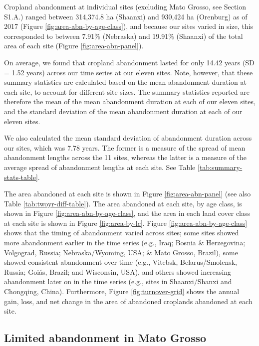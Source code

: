 \documentclass[9pt,twocolumn,twoside,lineno]{pnas-new}
\begin{document}
Cropland abandonment at individual sites (excluding Mato Grosso, see Section S1.A.) ranged between 314,374.8 ha (Shaanxi) and 930,424 ha (Orenburg) as of 2017 (Figure \ref{fig:area-abn-by-age-class}), and because our sites varied in size, this corresponded to between 7.91\% (Nebraska) and 19.91\% (Shaanxi) of the total area of each site (Figure \ref{fig:area-abn-panel}).

On average, we found that cropland abandonment lasted for only 14.42 years (SD = 1.52 years) across our time series at our eleven sites.
Note, however, that these summary statistics are calculated based on the mean abandonment duration at each site, to account for different site sizes.
The summary statistics reported are therefore the mean of the mean abandonment duration at each of our eleven sites, and the standard deviation of the mean abandonment duration at each of our eleven sites.

We also calculated the mean standard deviation of abandonment duration across our sites, which was 7.78 years.
The former is a measure of the spread of mean abandonment lengths across the 11 sites, whereas the latter is a measure of the average spread of abandonment lengths at each site.
See Table \ref{tab:summary-stats-table}.

The area abandoned at each site is shown in Figure \ref{fig:area-abn-panel} (see also Table \ref{tab:twoyr-diff-table}).
The area abandoned at each site, by age class, is shown in Figure \ref{fig:area-abn-by-age-class}, and the area in each land cover class at each site is shown in Figure \ref{fig:area-by-lc}.
Figure \ref{fig:area-abn-by-age-class} shows that the timing of abandonment varied across sites; some sites showed more abandonment earlier in the time series (e.g., Iraq; Bosnia \& Herzegovina; Volgograd, Russia; Nebraska/Wyoming, USA; \& Mato Grosso, Brazil), some showed consistent abandonment over time (e.g., Vitebsk, Belarus/Smolensk, Russia; Goiás, Brazil; and Wisconsin, USA), and others showed increasing abandonment later on in the time series (e.g., sites in Shaanxi/Shanxi and Chongqing, China).
Furthermore, Figure \ref{fig:turnover-grid} shows the annual gain, loss, and net change in the area of abandoned croplands abandoned at each site.

\hypertarget{mato-grosso}{%
\subsection{Limited abandonment in Mato Grosso}\label{mato-grosso}}
\end{document}
